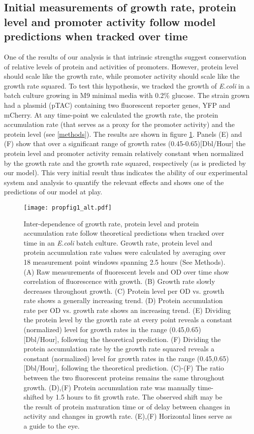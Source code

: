 \documentclass[a4page,notitlepage]{article}
\begin{document}
\subsection{Initial measurements of growth rate, protein level and promoter activity follow model predictions when tracked over time}
One of the results of our analysis is that intrinsic strengths suggest conservation of relative levels of protein and activities of promoters.
However, protein level should scale like the growth rate, while promoter activity should scale like the growth rate squared.
To test this hypothesis, we tracked the growth of \emph{E.coli} in a batch culture growing in M9 minimal media with 0.2\% glucose.
The strain grown had a plasmid (pTAC) containing two fluorescent reporter genes, YFP and mCherry.
At any time-point we calculated the growth rate, the protein accumulation rate (that serves as a proxy for the promoter activity) and the protein level (see \ref{methods}).
The results are shown in figure \ref{time-gr-fig}.
Panels (E) and (F) show that over a significant range of growth rates (0.45-0.65)[Dbl/Hour] the protein level and promoter activity remain relatively constant when normalized by the growth rate and the growth rate squared, respectively (as is predicted by our model).
This very initial result thus indicates the ability of our experimental system and analysis to quantify the relevant effects and shows one of the predictions of our model at play.
\begin{figure}[h]
\texttt{[image: propfig1\_alt.pdf]}
\caption{Inter-dependence of growth rate, protein level and protein accumulation rate follow theoretical predictions when tracked over time in an \emph{E.coli} batch culture.
Growth rate, protein level and protein accumulation rate values were calculated by averaging over 18 measurement point windows spanning 2.5 hours (See Methods).
(A) Raw measurements of fluorescent levels and OD over time show correlation of fluorescence with growth.
(B) Growth rate slowly decreases throughout growth.
(C) Protein level per OD vs. growth rate shows a generally increasing trend.
(D) Protein accumulation rate per OD vs. growth rate shows an increasing trend.
(E) Dividing the protein level by the growth rate at every point reveals a constant (normalized) level for growth rates in the range (0.45,0.65)[Dbl/Hour], following the theoretical prediction.
(F) Dividing the protein accumulation rate by the growth rate squared reveals a constant (normalized) level for growth rates in the range (0.45,0.65)[Dbl/Hour], following the theoretical prediction.
(C)-(F) The ratio between the two fluorescent proteins remains the same throughout growth.
(D),(F) Protein accumulation rate was manually time-shifted by 1.5 hours to fit growth rate.
The observed shift may be the result of protein maturation time or of delay between changes in activity and changes in growth rate.
(E),(F) Horizontal lines serve as a guide to the eye.
}
\label{time-gr-fig}
\end{figure}
\end{document}

